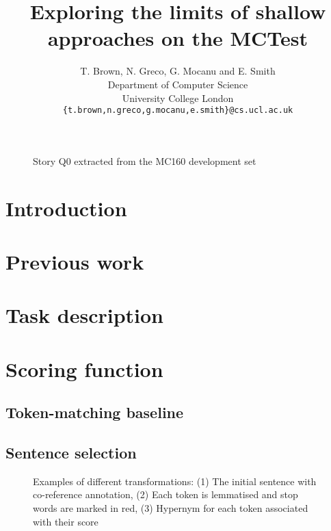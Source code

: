 \documentclass[11pt]{article}
\title{Exploring the limits of shallow approaches on the MCTest}
\author
       {T. Brown, N. Greco, G. Mocanu and E. Smith
       \\
       Department of Computer Science\\
	University College London\\
       \tt{\{t.brown,n.greco,g.mocanu,e.smith\}@cs.ucl.ac.uk}\\ 
       }
\date{}
\begin{document}
\maketitle

\begin{abstract}

\end{abstract}

\begin{figure}[!th]

\caption{\label{fig:exampleMCT} Story Q0 extracted from the MC160 development set}
\end{figure}

\section{Introduction}


\section{Previous work}


\section{Task description}


\section{Scoring function}


    \subsection{Token-matching baseline}
    

    \subsection{Sentence selection}
    


    \begin{figure*}[!th]
    
    \caption{\label{fig:preprocessing}Examples of different transformations: (1) The initial sentence with co-reference annotation, (2) Each token is lemmatised and stop words are marked in red, (3) Hypernym for each token associated with their score }
    \end{figure*}
\end{document}
